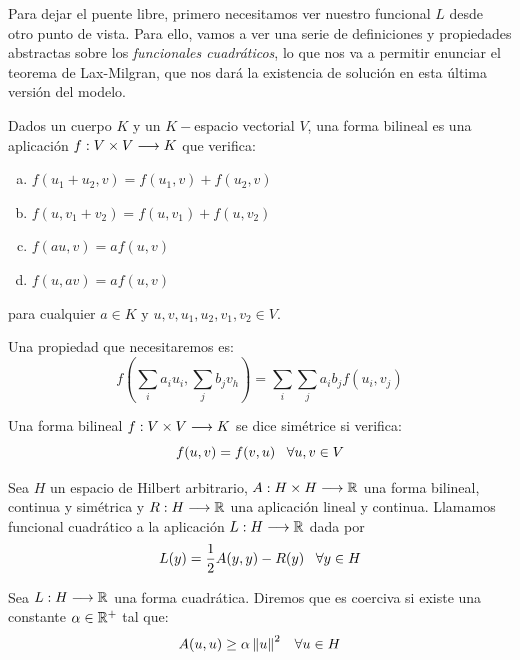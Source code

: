 Para dejar el puente libre, primero necesitamos ver nuestro funcional $L$ desde otro punto de vista. Para ello, vamos a ver una serie de definiciones y propiedades abstractas sobre los \textit{funcionales cuadráticos}, lo que nos va a permitir enunciar el teorema de Lax-Milgran, que nos dará la existencia de solución en esta última versión del modelo.

\begin{definition}\label{formabilineal}
Dados un cuerpo $K$ y un $K-$espacio vectorial $V$, una forma bilineal es una aplicación $f : V\times V \longrightarrow K$ que verifica:
\begin{enumerate}[(a)]
\item $f(u_1+u_2,v)=f(u_1,v)+f(u_2,v)$
\item $f(u, v_1+v_2)=f(u,v_1)+f(u,v_2)$
\item $f(au,v)=af(u,v)$
\item $f(u,av)=af(u,v)$
\end{enumerate}
para cualquier $a\in K$ y $u,v,u_1,u_2,v_1,v_2\in V$.

Una propiedad que necesitaremos es:
\[
f\left(\sum_ia_iu_i,\sum_jb_jv_h\right)=\sum_i\sum_ja_ib_jf(u_i,v_j)
\]

\end{definition}

\begin{definition}
Una forma bilineal $f : V\times V \longrightarrow K$ se dice simétrice si verifica:
\[
f(u,v)=f(v,u) \;\;\; \forall u,v\in V
\]
\end{definition}

\begin{definition}
Sea $H$ un espacio de Hilbert arbitrario, $A : H\times H \longrightarrow \mathbb{R}$ una forma bilineal, continua y simétrica y $R : H \longrightarrow \mathbb{R}$ una aplicación lineal y continua. Llamamos funcional cuadrático a la aplicación $L : H \longrightarrow \mathbb{R}$ dada por
\[
L(y)=\frac{1}{2}A(y,y)-R(y) \;\;\;\forall y\in H
\]
\end{definition}

\begin{definition}
Sea $L : H \longrightarrow \mathbb{R}$ una forma cuadrática. Diremos que es coerciva si existe una constante $\alpha\in\mathbb{R}^+$ tal que:
\[
A(u,u)\geq \alpha\left\lVert u\right\rVert^2 \;\;\; \forall u\in H
\]
\end{definition}

